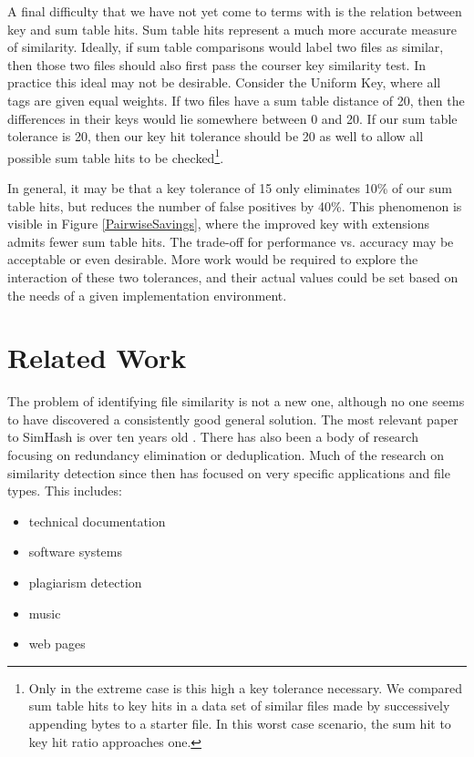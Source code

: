 \documentclass[10pt, twocolumn]{article}
\begin{document}
A final difficulty that we have not yet come to terms with is the relation between key and sum table hits.  Sum table hits represent a much more accurate measure of similarity.  Ideally, if sum table comparisons would label two files as similar, then those two files should also first pass the courser key similarity test.  In practice this ideal may not be desirable.  Consider the Uniform Key, where all tags are given equal weights.  If two files have a sum table distance of 20, then the differences in their keys would lie somewhere between 0 and 20. If our sum table tolerance is 20, then our key hit tolerance should be 20 as well to allow all possible sum table hits to be checked\footnote{Only in the extreme case is this high a key tolerance necessary. We compared sum table hits to key hits in a data set of similar files made by successively appending bytes to a starter file. In this worst case scenario, the sum hit to key hit ratio approaches one. }.

In general, it may be that a key tolerance of 15 only eliminates 10\% of our sum table hits, but reduces the number of false positives by 40\%.  This phenomenon is visible in Figure \ref{PairwiseSavings}, where the improved key with extensions admits fewer sum table hits.  The trade-off for performance vs. accuracy may be acceptable or even desirable.  More work would be required to explore the interaction of these two tolerances, and their actual values could be set based on the needs of a given implementation environment.

\section{Related Work}

The problem of identifying file similarity is not a new one, although no one seems to have discovered a consistently good general solution. The most relevant paper to SimHash is over ten years old \cite{manber}. There has also been a body of research focusing on redundancy elimination or deduplication. Much of the research on similarity detection since then has focused on very specific applications and file types. This includes:
\begin{itemize}
\item technical documentation \cite{hpDocRepositories} 
\item software systems \cite{sourcecode} 
\item plagiarism detection \cite{hoad} \cite{bernstein}
\item music \cite{music}
\item web pages \cite{buttler}
\end{itemize}
\end{document}
